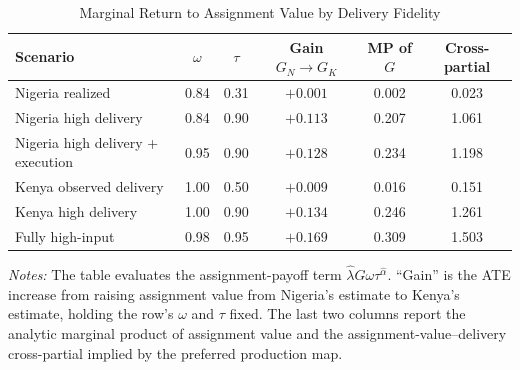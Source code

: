 \begin{table}[H]
\centering
\caption{Marginal Return to Assignment Value by Delivery Fidelity}
\label{tab:struct_signal_delivery_margins}
\begin{threeparttable}
\scriptsize
\setlength{\tabcolsep}{3pt}
\begin{tabular}[t]{>{\raggedright\arraybackslash}p{3.3cm}ccccc}
\toprule
Scenario & $\omega$ & $\tau$ & Gain $G_N\to G_K$ & MP of $G$ & Cross-partial \\
\midrule
Nigeria realized & 0.84 & 0.31 & $+0.001$ & 0.002 & 0.023 \\
Nigeria high delivery & 0.84 & 0.90 & $+0.113$ & 0.207 & 1.061 \\
Nigeria high delivery + execution & 0.95 & 0.90 & $+0.128$ & 0.234 & 1.198 \\
Kenya observed delivery & 1.00 & 0.50 & $+0.009$ & 0.016 & 0.151 \\
Kenya high delivery & 1.00 & 0.90 & $+0.134$ & 0.246 & 1.261 \\
Fully high-input & 0.98 & 0.95 & $+0.169$ & 0.309 & 1.503 \\
\bottomrule
\end{tabular}
\begin{tablenotes}
\footnotesize
\item \textit{Notes:} The table evaluates the assignment-payoff term $\hat{\lambda}G\omega\tau^{\hat{\alpha}}$. ``Gain'' is the ATE increase from raising assignment value from Nigeria's estimate to Kenya's estimate, holding the row's $\omega$ and $\tau$ fixed. The last two columns report the analytic marginal product of assignment value and the assignment-value--delivery cross-partial implied by the preferred production map.
\end{tablenotes}
\end{threeparttable}
\end{table}
